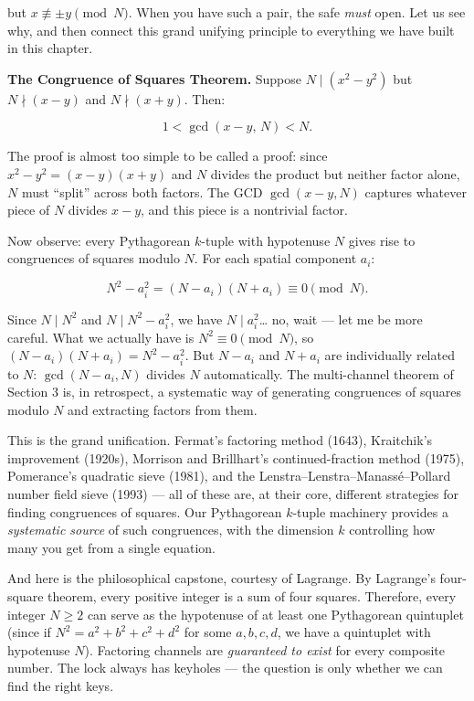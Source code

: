 but \(x \not\equiv \pm y \pmod{N}\). When you have such a pair, the safe \emph{must} open. Let us see why, and then connect this grand unifying principle to everything we have built in this chapter.

\textbf{The Congruence of Squares Theorem.} Suppose \(N \mid (x^2 - y^2)\) but \(N \nmid (x - y)\) and \(N \nmid (x + y)\). Then:

\[1 < \gcd(x - y, \, N) < N.\]

The proof is almost too simple to be called a proof: since \(x^2 - y^2 = (x - y)(x + y)\) and \(N\) divides the product but neither factor alone, \(N\) must ``split'' across both factors. The GCD \(\gcd(x - y, N)\) captures whatever piece of \(N\) divides \(x - y\), and this piece is a nontrivial factor.

Now observe: every Pythagorean \(k\)-tuple with hypotenuse \(N\) gives rise to congruences of squares modulo \(N\). For each spatial component \(a_i\):

\[N^2 - a_i^2 = (N - a_i)(N + a_i) \equiv 0 \pmod{N}.\]

Since \(N \mid N^2\) and \(N \mid N^2 - a_i^2\), we have \(N \mid a_i^2\)\ldots{} no, wait --- let me be more careful. What we actually have is \(N^2 \equiv 0 \pmod{N}\), so \((N - a_i)(N + a_i) = N^2 - a_i^2\). But \(N - a_i\) and \(N + a_i\) are individually related to \(N\): \(\gcd(N - a_i, N)\) divides \(N\) automatically. The multi-channel theorem of Section 3 is, in retrospect, a systematic way of generating congruences of squares modulo \(N\) and extracting factors from them.

This is the grand unification. Fermat's factoring method (1643), Kraitchik's improvement (1920s), Morrison and Brillhart's continued-fraction method (1975), Pomerance's quadratic sieve (1981), and the Lenstra--Lenstra--Manassé--Pollard number field sieve (1993) --- all of these are, at their core, different strategies for finding congruences of squares. Our Pythagorean \(k\)-tuple machinery provides a \emph{systematic source} of such congruences, with the dimension \(k\) controlling how many you get from a single equation.

And here is the philosophical capstone, courtesy of Lagrange. By Lagrange's four-square theorem, every positive integer is a sum of four squares. Therefore, every integer \(N \geq 2\) can serve as the hypotenuse of at least one Pythagorean quintuplet (since if \(N^2 = a^2 + b^2 + c^2 + d^2\) for some \(a, b, c, d\), we have a quintuplet with hypotenuse \(N\)). Factoring channels are \emph{guaranteed to exist} for every composite number. The lock always has keyholes --- the question is only whether we can find the right keys.


